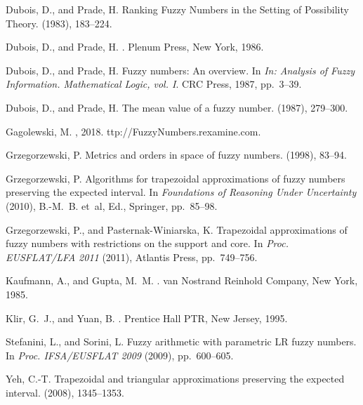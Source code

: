 \documentclass[11pt]{article}\usepackage[]{graphicx}\usepackage[]{color}
\begin{document}
\begin{thebibliography}{10}
{\sc Dubois, D., and Prade, H.}
\newblock Ranking Fuzzy Numbers in the Setting of Possibility Theory.
 (1983), 183--224.

{\sc Dubois, D., and Prade, H.}
.
\newblock Plenum Press, New York, 1986.

{\sc Dubois, D., and Prade, H.}
\newblock Fuzzy numbers: An overview.
\newblock In {\em In: Analysis of Fuzzy Information. Mathematical Logic, vol.
  I}. CRC Press, 1987, pp.~3--39.

{\sc Dubois, D., and Prade, H.}
\newblock The mean value of a fuzzy number.
 (1987), 279--300.

{\sc Gagolewski, M.}
, 2018.
ttp://FuzzyNumbers.rexamine.com.

{\sc Grzegorzewski, P.}
\newblock Metrics and orders in space of fuzzy numbers.
 (1998), 83--94.

{\sc Grzegorzewski, P.}
\newblock Algorithms for trapezoidal approximations of fuzzy numbers preserving
  the expected interval.
\newblock In {\em Foundations of Reasoning Under Uncertainty\/} (2010),
  B.-M.~B. et~al, Ed., Springer, pp.~85--98.

{\sc Grzegorzewski, P., and Pasternak-Winiarska, K.}
\newblock Trapezoidal approximations of fuzzy numbers with restrictions on the
  support and core.
\newblock In {\em Proc. EUSFLAT/LFA 2011\/} (2011), Atlantis Press,
  pp.~749--756.

{\sc Kaufmann, A., and Gupta, M.~M.}
.
\newblock van Nostrand Reinhold Company, New York, 1985.

{\sc Klir, G.~J., and Yuan, B.}
.
\newblock Prentice Hall PTR, New Jersey, 1995.

{\sc Stefanini, L., and Sorini, L.}
\newblock Fuzzy arithmetic with parametric {LR} fuzzy numbers.
\newblock In {\em Proc. IFSA/EUSFLAT 2009\/} (2009), pp.~600--605.

{\sc Yeh, C.-T.}
\newblock Trapezoidal and triangular approximations preserving the expected
  interval.
 (2008), 1345--1353.

\end{thebibliography}
\end{document}
